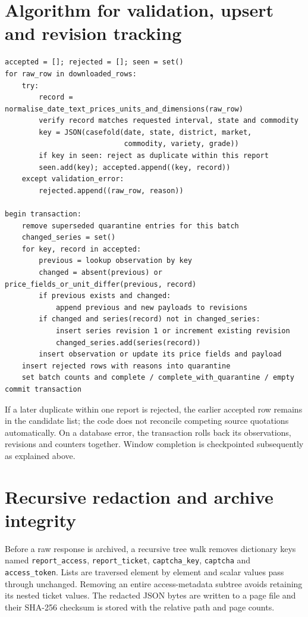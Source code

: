 \documentclass[12pt,a4paper,oneside]{report}
\numberwithin{equation}{chapter}
\numberwithin{figure}{chapter}
\numberwithin{table}{chapter}
\theoremstyle{definition}
\begin{document}
\section{Algorithm for validation, upsert and revision tracking}
\begin{lstlisting}[caption={Algorithm: ingest a complete downloaded window}]
accepted = []; rejected = []; seen = set()
for raw_row in downloaded_rows:
    try:
        record = normalise_date_text_prices_units_and_dimensions(raw_row)
        verify record matches requested interval, state and commodity
        key = JSON(casefold(date, state, district, market,
                            commodity, variety, grade))
        if key in seen: reject as duplicate within this report
        seen.add(key); accepted.append((key, record))
    except validation_error:
        rejected.append((raw_row, reason))

begin transaction:
    remove superseded quarantine entries for this batch
    changed_series = set()
    for key, record in accepted:
        previous = lookup observation by key
        changed = absent(previous) or price_fields_or_unit_differ(previous, record)
        if previous exists and changed:
            append previous and new payloads to revisions
        if changed and series(record) not in changed_series:
            insert series revision 1 or increment existing revision
            changed_series.add(series(record))
        insert observation or update its price fields and payload
    insert rejected rows with reasons into quarantine
    set batch counts and complete / complete_with_quarantine / empty
commit transaction
\end{lstlisting}

If a later duplicate within one report is rejected, the earlier accepted row remains in the candidate list; the code does not reconcile competing source quotations automatically. On a database error, the transaction rolls back its observations, revisions and counters together. Window completion is checkpointed subsequently as explained above.

\section{Recursive redaction and archive integrity}
Before a raw response is archived, a recursive tree walk removes dictionary keys named \texttt{report\_access}, \texttt{report\_ticket}, \texttt{captcha\_key}, \texttt{captcha} and \texttt{access\_token}. Lists are traversed element by element and scalar values pass through unchanged. Removing an entire access-metadata subtree avoids retaining its nested ticket values. The redacted JSON bytes are written to a page file and their SHA-256 checksum is stored with the relative path and page counts.
\end{document}
